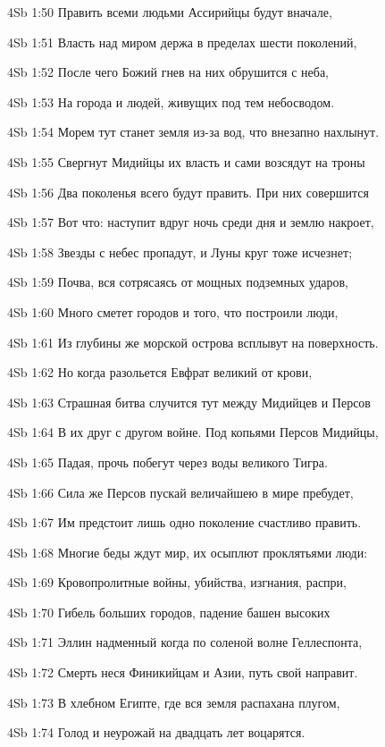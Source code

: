 \vs 4Sb 1:50 Править всеми людьми Ассирийцы будут вначале, 

\vs 4Sb 1:51 Власть над миром держа в пределах шести поколений,  

\vs 4Sb 1:52 После чего Божий гнев на них обрушится с неба, 

\vs 4Sb 1:53 На города и людей, живущих под тем небосводом. 

\vs 4Sb 1:54 Морем тут станет земля из-за вод, что внезапно нахлынут.

\vs 4Sb 1:55 Свергнут Мидийцы их власть и сами возсядут на троны  

\vs 4Sb 1:56 Два поколенья всего будут править. При них совершится 

\vs 4Sb 1:57 Вот что: наступит вдруг ночь среди дня и землю накроет, 

\vs 4Sb 1:58 Звезды с небес пропадут, и Луны круг тоже исчезнет; 

\vs 4Sb 1:59 Почва, вся сотрясаясь от мощных подземных ударов, 

\vs 4Sb 1:60 Много сметет городов и того, что построили люди,  

\vs 4Sb 1:61 Из глубины же морской острова всплывут на поверхность.

\vs 4Sb 1:62 Но когда разольется Евфрат великий от крови, 

\vs 4Sb 1:63 Страшная битва случится тут между Мидийцев и Персов 

\vs 4Sb 1:64 В их друг с другом войне. Под копьями Персов Мидийцы,

\vs 4Sb 1:65 Падая, прочь побегут через воды великого Тигра. 

\vs 4Sb 1:66 Сила же Персов пускай величайшею в мире пребудет, 

\vs 4Sb 1:67 Им предстоит лишь одно поколение счастливо править.

\vs 4Sb 1:68 Многие беды ждут мир, их осыплют проклятьями люди: 

\vs 4Sb 1:69 Кровопролитные войны, убийства, изгнания, распри, 

\vs 4Sb 1:70 Гибель больших городов, падение башен высоких  

\vs 4Sb 1:71 Эллин надменный когда по соленой волне Геллеспонта, 

\vs 4Sb 1:72 Смерть неся Финикийцам и Азии, путь свой направит.

\vs 4Sb 1:73 В хлебном Египте, где вся земля распахана плугом, 

\vs 4Sb 1:74 Голод и неурожай на двадцать лет воцарятся. 

